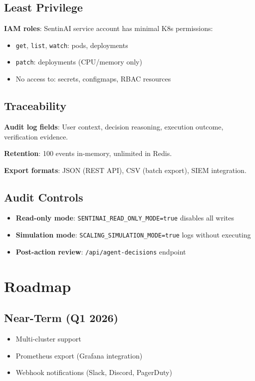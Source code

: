 \documentclass[11pt,a4paper]{article}
\begin{document}
\subsection{Least Privilege}
\textbf{IAM roles}: SentinAI service account has minimal K8s permissions:
\begin{itemize}
    \item \texttt{get}, \texttt{list}, \texttt{watch}: pods, deployments
    \item \texttt{patch}: deployments (CPU/memory only)
    \item No access to: secrets, configmaps, RBAC resources
\end{itemize}

\subsection{Traceability}
\textbf{Audit log fields}: User context, decision reasoning, execution outcome, verification evidence.

\textbf{Retention}: 100 events in-memory, unlimited in Redis.

\textbf{Export formats}: JSON (REST API), CSV (batch export), SIEM integration.

\subsection{Audit Controls}
\begin{itemize}
    \item \textbf{Read-only mode}: \texttt{SENTINAI\_READ\_ONLY\_MODE=true} disables all writes
    \item \textbf{Simulation mode}: \texttt{SCALING\_SIMULATION\_MODE=true} logs without executing
    \item \textbf{Post-action review}: \texttt{/api/agent-decisions} endpoint
\end{itemize}

\section{Roadmap}

\subsection{Near-Term (Q1 2026)}
\begin{itemize}
    \item Multi-cluster support
    \item Prometheus export (Grafana integration)
    \item Webhook notifications (Slack, Discord, PagerDuty)
\end{itemize}
\end{document}
